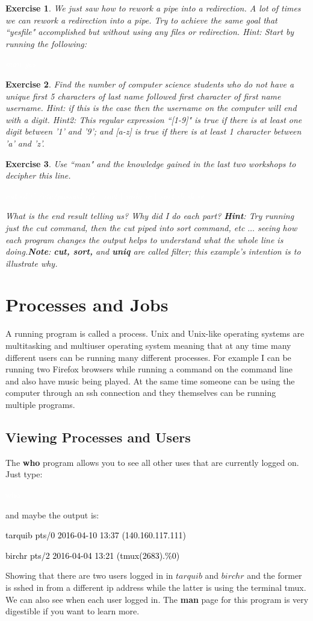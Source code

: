 \documentclass[oneside]{book}
\newcommand{\commandline}[1]{\begin{center} \colorbox{Dark}{\textcolor{white}{#1}} \end{center}}
\newcommand{\exampleout}[1]{\begin{center} \colorbox{Light}{\textcolor{black}{#1}} \end{center}}
\newtheorem{ex}{Exercise}[chapter]
\begin{document}
        \begin{ex}
            We just saw how to rework a pipe into a redirection. A lot of times we can rework a redirection into a pipe. Try to achieve the same goal that ``yesfile" accomplished but without using any files or redirection. Hint: Start by running the following:
                \commandline{man yes}
        \end{ex}
        
        \begin{ex}
            Find the number of computer science students who do not have a unique first 5 characters of last name followed first character of first name username. Hint: if this is the case then the username on the computer will end with a digit. Hint2: This regular expression ``[1-9]" is true if there is at least one digit between '1' and '9'; and [a-z] is true if there is at least 1 character between 'a' and 'z'.
        \end{ex}
        
        \begin{ex}
            Use ``man" and the knowledge gained in the last two workshops to decipher this line. 
            \commandline{cut -d':' /etc/passwd -f7 $|$ sort $|$ uniq -c $|$ sort -b -h -r}
            What is the end result telling us? Why did I do each part? \textbf{Hint}: Try running just the cut command, then the cut piped into sort command, etc $\dots$ seeing how each program changes the output helps to understand what the whole line is doing.\textbf{Note}: \textbf{cut, sort,} and \textbf{uniq} are called filter; this example's intention is to illustrate why.
        \end{ex}
        
        

\section{Processes and Jobs}
    A running program is called a process. Unix and Unix-like operating systems are multitasking and multiuser operating system meaning that at any time many different users can be running many different processes. For example I can be running two Firefox browsers while running a command on the command line and also have music being played. At the same time someone can be using the computer through an ssh connection and they themselves can be running multiple programs.
    
\subsection{Viewing Processes and Users}
    The \textbf{who} program allows you to see all other uses that are currently logged on. Just type:
    \commandline{who}
    and maybe the output is:
    \exampleout{tarquib pts/0 2016-04-10 13:37 (140.160.117.111)}
    \exampleout{birchr  pts/2 2016-04-04 13:21 (tmux(2683).\%0)}
    Showing that there are two users logged in in $tarquib$ and $birchr$ and the former is sshed in from a different ip address while the latter is using the terminal tmux. We can also see when each user logged in. The \textbf{man} page for this program is very digestible if you want to learn more.
    
\end{document}
